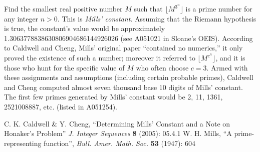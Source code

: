 \documentclass[12pt]{article}
\begin{document}
Find the smallest real positive number $M$ such that $\lfloor M^{3^n} \rfloor$ is a prime number for any integer $n > 0$. This is {\em Mills' constant}. Assuming that the Riemann hypothesis is true, the constant's value would be approximately 1.3063778838630806904686144926026 (see A051021 in Sloane's OEIS). According to Caldwell and Cheng, Mills' original paper ``contained no numerics,'' it only proved the existence of such a number; moreover it referred to $\lfloor M^{c^n} \rfloor$, and it is those who hunt for the specific value of $M$ who often choose $c = 3$. Armed with these assignments and assumptions (including certain probable primes), Caldwell and Cheng computed almost seven thousand base 10 digits of Mills' constant. The first few primes generated by Mills' constant would be 2, 11, 1361, 2521008887, etc. (listed in A051254).

\begin{thebibliography}{2}
 C. K. Caldwell \& Y. Cheng, ``Determining Mills' Constant and a Note on
Honaker's Problem'' {\it J. Integer Sequences} {\bf 8} (2005): 05.4.1
 W. H. Mills, ``A prime-representing function'', {\it Bull. Amer. Math. Soc.} {\bf 53} (1947): 604
\end{thebibliography}
\end{document}
